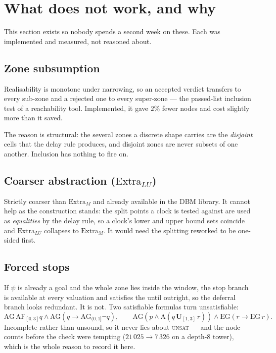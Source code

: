 \section{What does not work, and why}
\label{sec:negative}

This section exists so nobody spends a second week on these. Each was
implemented and measured, not reasoned about.

\subsection{Zone subsumption}

Realisability is monotone under narrowing, so an accepted verdict transfers to
every sub-zone and a rejected one to every super-zone --- the passed-list
inclusion test of a reachability tool. Implemented, it gave $2\%$ fewer nodes
and cost slightly more than it saved.

The reason is structural: the several zones a discrete shape carries are the
\emph{disjoint} cells that the delay rule produces, and disjoint zones are never
subsets of one another. Inclusion has nothing to fire on.

\subsection{Coarser abstraction ($\mathrm{Extra}_{LU}$)}

Strictly coarser than $\mathrm{Extra}_M$ and already available in the DBM
library. It cannot help as the construction stands: the split points a clock is
tested against are used as \emph{equalities} by the delay rule, so a clock's
lower and upper bound sets coincide and $\mathrm{Extra}_{LU}$ collapses to
$\mathrm{Extra}_M$. It would need the splitting reworked to be one-sided first.

\subsection{Forced stops}

If $\psi$ is already a goal and the whole zone lies inside the window, the stop
branch is available at every valuation and satisfies the until outright, so the
deferral branch looks redundant. It is not. Two satisfiable formulas turn
unsatisfiable:
\[
  \mathrm{AG}\,\mathrm{AF}_{[0,3]}q \wedge
  \mathrm{AG}(q\rightarrow \mathrm{AG}_{(0,1]}\neg q),
  \qquad
  \mathrm{AG}(p\wedge \mathrm{A}(q\,\mathbf{U}_{[1,3]}\,r)) \wedge
  \mathrm{EG}(r\rightarrow\mathrm{EG}\,r).
\]
Incomplete rather than unsound, so it never lies about \textsc{unsat} --- and
the node counts before the check were tempting ($21\,025\to 7\,326$ on a
depth-$8$ tower), which is the whole reason to record it here.

